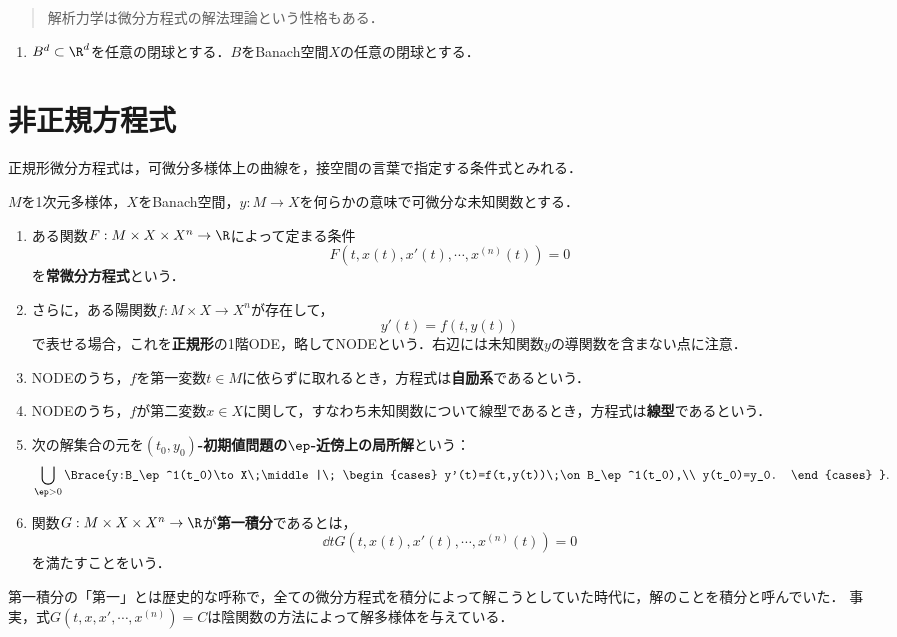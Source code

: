 \documentclass[uplatex,dvipdfmx]{jsreport}
\begin{document}
\begin{quotation}
    解析力学は微分方程式の解法理論という性格もある．
\end{quotation}

\begin{notation}\mbox{}
    \begin{enumerate}
        \item $B^d\subset\R^d$を任意の閉球とする．$B$をBanach空間$X$の任意の閉球とする．
    \end{enumerate}
\end{notation}

\section{非正規方程式}

\begin{tcolorbox}[colframe=ForestGreen, colback=ForestGreen!10!white,breakable,colbacktitle=ForestGreen!40!white,coltitle=black,fonttitle=\bfseries\sffamily,
    title=]
        正規形微分方程式は，可微分多様体上の曲線を，接空間の言葉で指定する条件式とみれる．
\end{tcolorbox}

\begin{definition}
    $M$を1次元多様体，$X$をBanach空間，$y:M\to X$を何らかの意味で可微分な未知関数とする．
    \begin{enumerate}
        \item ある関数$F:M\times X\times X^n\to\R$によって定まる条件
        \[F(t,x(t),x'(t),\cdots,x^{(n)}(t))=0\]
        を\textbf{常微分方程式}という．
        \item さらに，ある陽関数$f:M\times X\to X^n$が存在して，
        \[y'(t)=f(t,y(t))\]
        で表せる場合，これを\textbf{正規形}の1階ODE，略してNODEという．右辺には未知関数$y$の導関数を含まない点に注意．
        \item NODEのうち，$f$を第一変数$t\in M$に依らずに取れるとき，方程式は\textbf{自励系}であるという．
        \item NODEのうち，$f$が第二変数$x\in X$に関して，すなわち未知関数について線型であるとき，方程式は\textbf{線型}であるという．
        \item 次の解集合の元を\textbf{$(t_0,y_0)$-初期値問題の$\ep$-近傍上の局所解}という：
        \[\bigcup_{\ep>0}\Brace{y:B_\ep^1(t_0)\to X\;\middle|\;
        \begin{cases}
            y'(t)=f(t,y(t))\;\on B_\ep^1(t_0),\\
            y(t_0)=y_0.
        \end{cases}
        }.\]
        \item 関数$G:M\times X\times X^n\to\R$が\textbf{第一積分}であるとは，
        \[\dd{}{t}G(t,x(t),x'(t),\cdots,x^{(n)}(t))=0\]
        を満たすことをいう．
    \end{enumerate}
\end{definition}
\begin{history}
    第一積分の「第一」とは歴史的な呼称で，全ての微分方程式を積分によって解こうとしていた時代に，解のことを積分と呼んでいた．
    事実，式$G(t,x,x',\cdots,x^{(n)})=C$は陰関数の方法によって解多様体を与えている．
\end{history}
\end{document}
